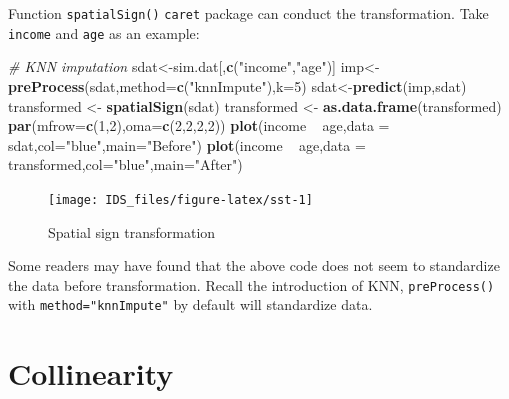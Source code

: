 \documentclass[12pt,]{krantz}
\newenvironment{Shaded}{\begin{snugshade}}{\end{snugshade}}
\newcommand{\KeywordTok}[1]{\textcolor[rgb]{0.13,0.29,0.53}{\textbf{{#1}}}}
\newcommand{\DataTypeTok}[1]{\textcolor[rgb]{0.13,0.29,0.53}{{#1}}}
\newcommand{\DecValTok}[1]{\textcolor[rgb]{0.00,0.00,0.81}{{#1}}}
\newcommand{\StringTok}[1]{\textcolor[rgb]{0.31,0.60,0.02}{{#1}}}
\newcommand{\CommentTok}[1]{\textcolor[rgb]{0.56,0.35,0.01}{\textit{{#1}}}}
\newcommand{\NormalTok}[1]{{#1}}
\theoremstyle{definition}
\theoremstyle{definition}
\theoremstyle{remark}
\begin{document}
Function \texttt{spatialSign()} \texttt{caret} package can conduct the
transformation. Take \texttt{income} and \texttt{age} as an example:

\begin{Shaded}
\begin{Highlighting}[]
\CommentTok{# KNN imputation}
\NormalTok{sdat<-sim.dat[,}\KeywordTok{c}\NormalTok{(}\StringTok{"income"}\NormalTok{,}\StringTok{"age"}\NormalTok{)]}
\NormalTok{imp<-}\KeywordTok{preProcess}\NormalTok{(sdat,}\DataTypeTok{method=}\KeywordTok{c}\NormalTok{(}\StringTok{"knnImpute"}\NormalTok{),}\DataTypeTok{k=}\DecValTok{5}\NormalTok{)}
\NormalTok{sdat<-}\KeywordTok{predict}\NormalTok{(imp,sdat)}
\NormalTok{transformed <-}\StringTok{ }\KeywordTok{spatialSign}\NormalTok{(sdat)}
\NormalTok{transformed <-}\StringTok{ }\KeywordTok{as.data.frame}\NormalTok{(transformed)}
\KeywordTok{par}\NormalTok{(}\DataTypeTok{mfrow=}\KeywordTok{c}\NormalTok{(}\DecValTok{1}\NormalTok{,}\DecValTok{2}\NormalTok{),}\DataTypeTok{oma=}\KeywordTok{c}\NormalTok{(}\DecValTok{2}\NormalTok{,}\DecValTok{2}\NormalTok{,}\DecValTok{2}\NormalTok{,}\DecValTok{2}\NormalTok{))}
\KeywordTok{plot}\NormalTok{(income ~}\StringTok{ }\NormalTok{age,}\DataTypeTok{data =} \NormalTok{sdat,}\DataTypeTok{col=}\StringTok{"blue"}\NormalTok{,}\DataTypeTok{main=}\StringTok{"Before"}\NormalTok{)}
\KeywordTok{plot}\NormalTok{(income ~}\StringTok{ }\NormalTok{age,}\DataTypeTok{data =} \NormalTok{transformed,}\DataTypeTok{col=}\StringTok{"blue"}\NormalTok{,}\DataTypeTok{main=}\StringTok{"After"}\NormalTok{)}
\end{Highlighting}
\end{Shaded}

\begin{figure}

{\centering \texttt{[image: IDS\_files/figure-latex/sst-1]} 

}

\caption{Spatial sign transformation}\label{fig:sst}
\end{figure}

Some readers may have found that the above code does not seem to
standardize the data before transformation. Recall the introduction of
KNN, \texttt{preProcess()} with \texttt{method="knnImpute"} by default
will standardize data.

\section{Collinearity}\label{collinearity}
\end{document}
